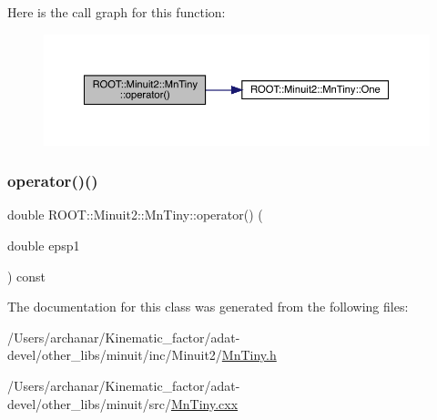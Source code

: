 Here is the call graph for this function\+:
\nopagebreak
\begin{figure}[H]
\begin{center}
\leavevmode
\includegraphics[width=350pt]{d6/d77/classROOT_1_1Minuit2_1_1MnTiny_ae266eaf0c58687bf37419ca463c51bf7_cgraph}
\end{center}
\end{figure}
\mbox{\label{classROOT_1_1Minuit2_1_1MnTiny_ae266eaf0c58687bf37419ca463c51bf7}} 
\subsubsection{\texorpdfstring{operator()()}{operator()()}\hspace{0.1cm}{\footnotesize\ttfamily [3/3]}}
{\footnotesize\ttfamily double R\+O\+O\+T\+::\+Minuit2\+::\+Mn\+Tiny\+::operator() (\begin{DoxyParamCaption}\item[{double}]{epsp1 }\end{DoxyParamCaption}) const}



The documentation for this class was generated from the following files\+:\begin{DoxyCompactItemize}
\item 
/\+Users/archanar/\+Kinematic\+\_\+factor/adat-\/devel/other\+\_\+libs/minuit/inc/\+Minuit2/\mbox{\hyperlink{adat-devel_2other__libs_2minuit_2inc_2Minuit2_2MnTiny_8h}{Mn\+Tiny.\+h}}\item 
/\+Users/archanar/\+Kinematic\+\_\+factor/adat-\/devel/other\+\_\+libs/minuit/src/\mbox{\hyperlink{adat-devel_2other__libs_2minuit_2src_2MnTiny_8cxx}{Mn\+Tiny.\+cxx}}\end{DoxyCompactItemize}
